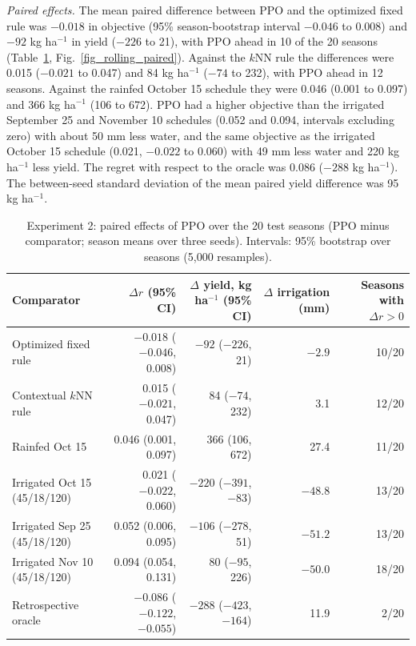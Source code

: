 \documentclass[times,final,authoryear]{elsarticle}
\begin{document}
\emph{Paired effects.} The mean paired difference between PPO and the optimized fixed rule was $-0.018$ in objective (95\% season-bootstrap interval $-0.046$ to 0.008) and $-92$ kg ha$^{-1}$ in yield ($-226$ to 21), with PPO ahead in 10 of the 20 seasons (Table~\ref{tab_paired_e2}, Fig.~\ref{fig_rolling_paired}). Against the $k$NN rule the differences were 0.015 ($-0.021$ to 0.047) and 84 kg ha$^{-1}$ ($-74$ to 232), with PPO ahead in 12 seasons. Against the rainfed October 15 schedule they were 0.046 (0.001 to 0.097) and 366 kg ha$^{-1}$ (106 to 672). PPO had a higher objective than the irrigated September 25 and November 10 schedules (0.052 and 0.094, intervals excluding zero) with about 50 mm less water, and the same objective as the irrigated October 15 schedule (0.021, $-0.022$ to 0.060) with 49 mm less water and 220 kg ha$^{-1}$ less yield. The regret with respect to the oracle was 0.086 ($-288$ kg ha$^{-1}$). The between-seed standard deviation of the mean paired yield difference was 95 kg ha$^{-1}$.

\begin{table}[!h]
\centering
\scriptsize
\caption{Experiment 2: paired effects of PPO over the 20 test seasons (PPO minus comparator; season means over three seeds). Intervals: 95\% bootstrap over seasons (5,000 resamples).}
\label{tab_paired_e2}
\begin{tabular}{lrrrr}
\hline
Comparator & $\Delta r$ (95\% CI) & $\Delta$ yield, kg ha$^{-1}$ (95\% CI) & $\Delta$ irrigation (mm) & Seasons with $\Delta r > 0$ \\
\hline
Optimized fixed rule & $-0.018$ ($-0.046$, 0.008) & $-92$ ($-226$, 21) & $-2.9$ & 10/20 \\
Contextual $k$NN rule & 0.015 ($-0.021$, 0.047) & 84 ($-74$, 232) & 3.1 & 12/20 \\
Rainfed Oct 15 & 0.046 (0.001, 0.097) & 366 (106, 672) & 27.4 & 11/20 \\
Irrigated Oct 15 (45/18/120) & 0.021 ($-0.022$, 0.060) & $-220$ ($-391$, $-83$) & $-48.8$ & 13/20 \\
Irrigated Sep 25 (45/18/120) & 0.052 (0.006, 0.095) & $-106$ ($-278$, 51) & $-51.2$ & 13/20 \\
Irrigated Nov 10 (45/18/120) & 0.094 (0.054, 0.131) & 80 ($-95$, 226) & $-50.0$ & 18/20 \\
Retrospective oracle & $-0.086$ ($-0.122$, $-0.055$) & $-288$ ($-423$, $-164$) & 11.9 & 2/20 \\
\hline
\end{tabular}
\end{table}
\end{document}
